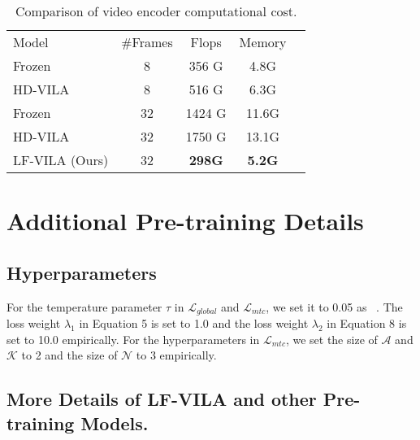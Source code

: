 \documentclass{article}
\begin{document}
\begin{table}[t]
    \small
    \centering
    \caption{Comparison of video encoder computational cost.}
    \begin{tabular}{l c c c c} 
    \toprule
    Model & \#Frames  & Flops & Memory \\
    \cmidrule{1-4}
    Frozen~\cite{bain2021frozen} &8  & 356 G & 4.8G  \\
    HD-VILA~\cite{xue2021hdvila} &8  & 516 G & 6.3G \\
    Frozen~\cite{bain2021frozen} &32  & 1424 G & 11.6G  \\
    HD-VILA~\cite{xue2021hdvila} &32  & 1750 G & 13.1G \\
    \cmidrule{1-4}
    LF-VILA (Ours)  &32  & \bf298G & \bf5.2G  \\
    \bottomrule
    \end{tabular}
    \label{tab:backbone}
\end{table}


\section{Additional Pre-training Details}\label{sec:app_training}
\subsection{Hyperparameters}
For the temperature parameter $\tau$ in $\mathcal{L}_{global}$ and  $\mathcal{L}_{mtc}$, we set it to 0.05 as ~\cite{bain2021frozen,xue2021hdvila}. The loss weight $\lambda_1$ in Equation 5 is set to 1.0 and the loss weight $\lambda_2$ in Equation 8 is set to 10.0 empirically. For the hyperparameters in $\mathcal{L}_{mtc}$, we set the size of $\mathcal{A}$ and $\mathcal{K}$ to 2 and the size of $\mathcal{N}$ to 3 empirically.

\subsection{More Details of LF-VILA and other Pre-training Models.}
\end{document}
